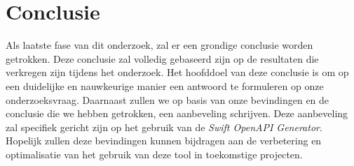 \section{Conclusie}
Als laatste fase van dit onderzoek, zal er een grondige conclusie worden getrokken. Deze conclusie zal volledig gebaseerd zijn op de resultaten die verkregen zijn tijdens het onderzoek. Het hoofddoel van deze conclusie is om op een duidelijke en nauwkeurige manier een antwoord te formuleren op onze onderzoeksvraag. Daarnaast zullen we op basis van onze bevindingen en de conclusie die we hebben getrokken, een aanbeveling schrijven. Deze aanbeveling zal specifiek gericht zijn op het gebruik van de \textit{Swift OpenAPI Generator}. Hopelijk zullen deze bevindingen kunnen bijdragen aan
de verbetering en optimalisatie van het gebruik van deze tool in toekomstige projecten.


